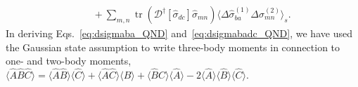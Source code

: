 \documentclass[aps,pra,twocolumn,superscriptaddress]{revtex4-1} %
\DeclareMathOperator{\tr}{tr}
\newcommand{\expect}[1]{\big\langle #1 \big\rangle}
\begin{document}
\begin{appendix}
\begin{align}
&\quad +\!\! \sum_{m,n}\!\tr\!\left(\mathcal{D}^\dagger[\hat{\sigma}_{dc}]\hat{\sigma}_{mn} \right)\!\expect{\!\Delta\hat{\sigma}_{ba}^{(\!1\!)}\Delta\sigma_{mn}^{(\!2\!)} }_s .\label{eq:dsigmabadc_op_expand}
\end{align} 
In deriving Eqs.~\eqref{eq:dsigmaba_QND} and~\eqref{eq:dsigmabadc_QND}, we have used the Gaussian state assumption to write three-body moments in connection to one- and two-body moments, $ \expect{\hat{A}\hat{B}\hat{C}}=\expect{\hat{A}\hat{B}}\expect{\hat{C}}+ \expect{\hat{A}\hat{C} }\expect{\hat{B}}+\expect{\hat{B}\hat{C} }\expect{\hat{A}}-2\expect{\hat{A}}\expect{\hat{B}}\expect{\hat{C}} $. 


\end{appendix}
\end{document}
